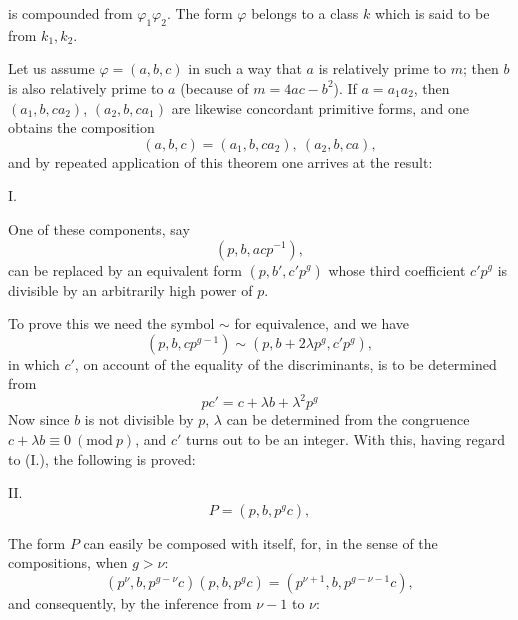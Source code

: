 is compounded from $\varphi_1\varphi_2$. The form $\varphi$ belongs to a class $k$ which is said to be  from $k_1,k_2$.

Let us assume $\varphi=(a,b,c)$ in such a way that $a$ is relatively prime to $m$; then $b$ is also relatively prime to $a$ (because of $m=4ac-b^2$). If $a=a_1a_2$, then $(a_1,b,ca_2)$, $(a_2,b,ca_1)$ are likewise concordant primitive forms, and one obtains the composition
\[
(a,b,c) = (a_1,b,ca_2),\ (a_2,b,ca), %
\]
and by repeated application of this theorem one arrives at the result:

I. 

One of these components, say
\[
(p,b,acp^{-1}),
\]
can be replaced by an equivalent form $(p,b',c'p^g)$ whose third coefficient $c'p^g$ is divisible by an arbitrarily high power of $p$.

To prove this we need the symbol $\sim$ for equivalence, and we have
\[
(p,b,cp^{g-1}) \sim (p,b+2\lambda p^g,c'p^g),
\]
in which $c'$, on account of the equality of the discriminants, is to be determined from
\[
pc' = c+\lambda b+\lambda^2 p^g
\]
Now since $b$ is not divisible by $p$, $\lambda$ can be determined from the congruence $c+\lambda b \equiv 0\ (\mathrm{mod}\ p)$, and $c'$ turns out to be an integer. With this, having regard to (I.), the following is proved:

II. 
\[
P=(p,b,p^gc),
\]

The form $P$ can easily be composed with itself, for, in the sense of the compositions, when $g>\nu$:
\[
(p^\nu,b,p^{g-\nu}c)(p,b,p^gc) = (p^{\nu+1},b,p^{g-\nu-1}c),
\]
and consequently, by the inference from $\nu-1$ to $\nu$:
